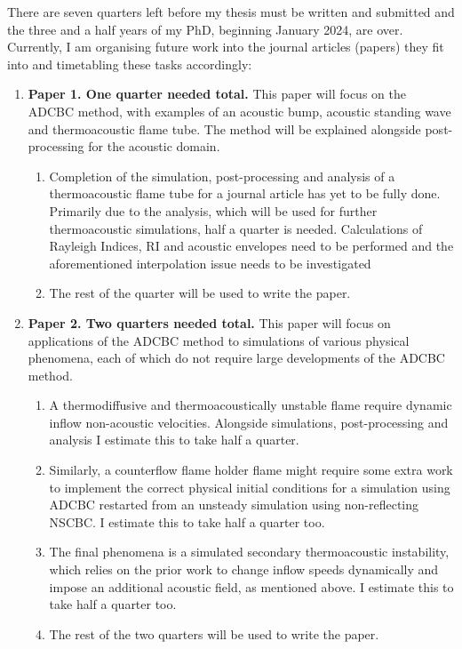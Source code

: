 There are seven quarters left before my thesis must be written and submitted and the three and a half years of my PhD, beginning January 2024, are over. Currently, I am organising future work into the journal articles (papers) they fit into and timetabling these tasks accordingly:
\begin{enumerate}
\item \textbf{Paper 1. One quarter needed total.} This paper will focus on the ADCBC method, with examples of an acoustic bump, acoustic standing wave and thermoacoustic flame tube. The method will be explained alongside post-processing for the acoustic domain.
    \begin{enumerate}
    \item Completion of the simulation, post-processing and analysis of a thermoacoustic flame tube for a journal article has yet to be fully done. Primarily due to the analysis, which will be used for further thermoacoustic simulations, half a quarter is needed. Calculations of Rayleigh Indices, RI and acoustic envelopes need to be performed and the aforementioned interpolation issue needs to be investigated
    \item The rest of the quarter will be used to write the paper.
    \end{enumerate}
\item \textbf{Paper 2. Two quarters needed total.} This paper will focus on applications of the ADCBC method to simulations of various physical phenomena, each of which do not require large developments of the ADCBC method.
    \begin{enumerate}
    \item A thermodiffusive and thermoacoustically unstable flame require dynamic inflow non-acoustic velocities. Alongside simulations, post-processing and analysis I estimate this to take half a quarter.
    \item Similarly, a counterflow flame holder flame might require some extra work to implement the correct physical initial conditions for a simulation using ADCBC restarted from an unsteady simulation using non-reflecting NSCBC. I estimate this to take half a quarter too.
    \item The final phenomena is a simulated secondary thermoacoustic instability, which relies on the prior work to change inflow speeds dynamically and impose an additional acoustic field, as mentioned above. I estimate this to take half a quarter too.
    \item The rest of the two quarters will be used to write the paper.

\end{enumerate}
\end{enumerate}
